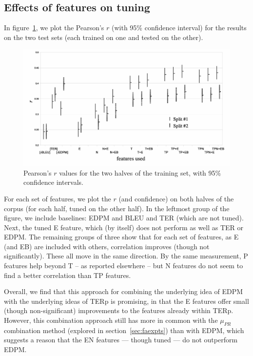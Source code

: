 \documentclass{kluwer}    %
\begin{document}
\begin{article}
\subsection{Effects of features on tuning}
In figure~\ref{fig:tuneresults}, we plot the Pearson's $r$ (with 95\%
confidence interval) for the results on the two test sets (each
trained on one and tested on the other).
\begin{figure}
  \begin{center}
    \includegraphics[scale=0.45]{tuning.eps}
  \end{center}
  \caption{Pearson's $r$ values for the two halves of the training
    set, with 95\% confidence intervals. }
  \label{fig:tuneresults}
\end{figure}
%
For each set of features, we plot the $r$ (and confidence) on both
halves of the corpus (for each half, tuned on the other half). In the
leftmost group of the figure, we include baselines: EDPM and BLEU and
TER (which are not tuned).  Next, the tuned E feature, which (by
itself) does not perform as well as TER or EDPM.
%
The remaining groups of three show that for each set of features, as E
(and EB) are included with others, correlation improves (though not
significantly).  These all move in the same direction. By the same
measurement, P features help beyond T -- as reported elsewhere -- but
N features do not seem to find a better correlation than TP features.

Overall, we find that this approach for combining the underlying idea
of EDPM with the underlying ideas of TERp is promising, in that the E
features offer small (though non-significant) improvements to the
features already within TERp. However, this combination approach still
has more in common with the $\mu_{PR}$ combination method (explored in
section~\ref{sec:faexpts}) than with EDPM, which suggests a reason
that the EN features --- though tuned --- do not outperform EDPM.


\end{article}
\end{document}
